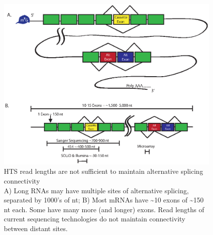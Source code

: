     \begin{figure} %
      \centering 
      \includegraphics{Figures/Intro/SeqLengths_and_Connectivity.eps}
      \caption[HTS read lengths are not sufficient to maintain alternative splicing connectivity]
      {
        HTS read lengths are not sufficient to maintain alternative splicing connectivity\\[0.25cm]
        A) Long RNAs may have multiple sites of alternative splicing, separated by 1000's of nt; B) Most mRNAs have \textasciitilde10 exons of \textasciitilde150 nt each. Some have many more (and longer) exons. Read lengths of current sequencing technologies do not maintain connectivity between distant sites.
        }
      \label{Intro:fig:NoConnectivityInHTSMethods}
      \end{figure}

